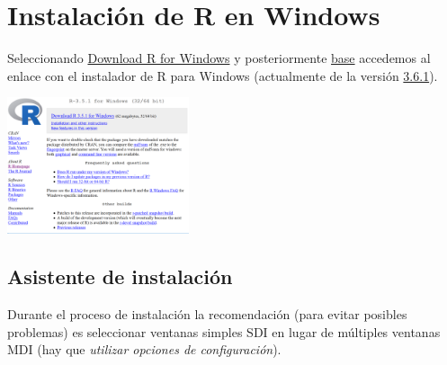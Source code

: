 \documentclass[]{book}
\begin{document}
\hypertarget{instalacion-de-r-en-windows}{%
\section{Instalación de R en Windows}\label{instalacion-de-r-en-windows}}

Seleccionando \href{http://ftp.cixug.es/CRAN/bin/windows/}{Download R for Windows} y posteriormente
\href{http://ftp.cixug.es/CRAN/bin/windows/base/}{base} accedemos
al enlace con el instalador de R para Windows (actualmente de la versión
\href{http://ftp.cixug.es/CRAN/bin/windows/base/R-3.6.1-win.exe}{3.6.1}).

\includegraphics[width=0.4\textwidth,height=\textheight]{figuras/R351.png}

\hypertarget{asistente-de-instalacion}{%
\subsection{Asistente de instalación}\label{asistente-de-instalacion}}

Durante el proceso de instalación la recomendación (para evitar posibles
problemas) es seleccionar ventanas simples SDI en lugar de múltiples
ventanas MDI (hay que \emph{utilizar opciones de configuración}).
\end{document}
